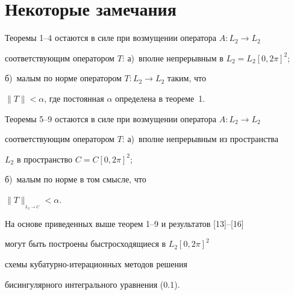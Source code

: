 \section{Некоторые замечания}








\begin{note}


Теоремы 1--4 остаются в силе при возмущении оператора $A:L_2\to L_2$


соответствующим оператором $T$: а)~вполне непрерывным в $L_2=L_2[0,2\pi]^2$;


б)~малым по норме оператором $T:L_2 \to L_2$ таким, что


$\|T\|<\alpha$, где постоянная $\alpha$ определена в теореме~1.


\end{note}








\begin{note}


Теоремы 5--9 остаются в силе при возмущении оператора $A:L_2\to L_2$


соответствующим оператором $T$: а)~вполне непрерывным из пространства


$L_2$ в пространство $C=C[0,2\pi]^2$;


б)~малым по норме в том смысле, что


$\|T\|_{{}_{\scriptstyle L_2\rightarrow C}}<\alpha$.


\end{note}





\begin{note}


На основе приведенных выше теорем 1--9 и результатов [13]--[16]


могут быть построены быстросходящиеся в $L_2[0,2\pi ]^2$


схемы кубатурно-итерационных методов решения


бисингулярного интегрального уравнения (0.1).


\end{note}








